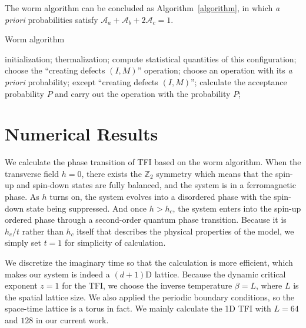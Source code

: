 \documentclass{article}
\theoremstyle{plain} \newtheorem{thm}{Theorem}[section]
\theoremstyle{definition} \newtheorem{df}{Definition}[section]
\theoremstyle{definition} \newtheorem{eg}{Example}
\theoremstyle{remark} \newtheorem*{rmk}{Remark}
\begin{document}
The worm algorithm can be concluded as Algorithm~\ref{algorithm}, in which \textit{a priori} probabilities satisfy $\mathcal{A}_a+\mathcal{A}_b+2\mathcal{A}_c = 1$.\\
\begin{minipage}{\linewidth}
  \begin{algorithm}[H]
  \caption{Worm algorithm}
  \label{algorithm}
  \begin{algorithmic}
    \STATE initialization;
    \STATE thermalization;
    \LOOP
        \STATE compute statistical quantities of this configuration;
        \STATE choose the ``creating defects $(I, M)$'' operation;
      \ELSE
        \STATE  choose an operation with its \textit{a priori}  probability;
        except ``creating defects $(I, M)$'';
      \ENDIF
      \STATE calculate the acceptance probability $P$ and carry out the operation with the probability $P$;
    \ENDLOOP
  \end{algorithmic}
\end{algorithm}
\end{minipage}
\vspace{3mm}

\section{Numerical Results}
We calculate the phase transition of TFI based on the worm algorithm. When the transverse field $h = 0$, there exists the $\mathbb{Z}_2$ symmetry which means that the spin-up and spin-down states are fully balanced, and the system is in a ferromagnetic phase. As $h$ turns on, the system evolves into a disordered phase with the spin-down state being suppressed. And once $h > h_c$, the system enters into the spin-up ordered phase through a second-order quantum phase transition. Because it is $h_c/t$ rather than $h_c$ itself that describes the physical properties of the model, we simply set $t = 1$ for simplicity of calculation.

We discretize the imaginary time so that the calculation is more efficient, which makes our system is indeed a $(d+1)$D lattice. Because the dynamic critical exponent $z = 1$ for the TFI, we choose the inverse temperature $\beta = L$, where $L$ is the spatial lattice size. We also applied the periodic boundary conditions, so the space-time lattice is a torus in fact. We mainly calculate the 1D TFI with $L = 64$ and $128$ in our current work.
\end{document}
